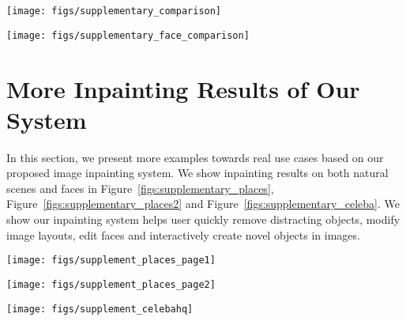 \documentclass[10pt,twocolumn,letterpaper]{article}
\begin{document}
\begin{figure*}[ht]
  \centering
  \vspace*{-9.5mm}
  \texttt{[image: figs/supplementary\_comparison]}
  \vspace*{-5mm}
  \caption{More comparison results on natural scenes. Best-viewed with zoom-in on PDF to see color shadows and artifacts.}
  \label{figs:supplementary_comparison}
\end{figure*}

\begin{figure*}[ht]
  \centering
  \texttt{[image: figs/supplementary\_face\_comparison]}
  \caption{More comparison results on faces. Best-viewed with zoom-in on PDF to see color shadows and artifacts.}
  \label{figs:supplementary_face_comparison}
\end{figure*}

\section{More Inpainting Results of Our System} \label{secs:more_results}
In this section, we present more examples towards real use cases based on our proposed image inpainting system. We show inpainting results on both natural scenes and faces in Figure~\ref{figs:supplementary_places}, Figure~\ref{figs:supplementary_places2} and Figure~\ref{figs:supplementary_celeba}. We show our inpainting system helps user quickly remove distracting objects, modify image layouts, edit faces and interactively create novel objects in images.

\begin{figure*}[t]
  \centering
  \texttt{[image: figs/supplement\_places\_page1]}
  \caption{More results from our free-form inpainting system on natural images (1).}
  \label{figs:supplementary_places}
\end{figure*}

\begin{figure*}[t]
  \centering
  \texttt{[image: figs/supplement\_places\_page2]}
  \caption{More results from our free-form inpainting system on natural images (2).}
  \label{figs:supplementary_places2}
\end{figure*}

\begin{figure*}[ht]
  \centering
  \texttt{[image: figs/supplement\_celebahq]}
  \caption{More results from our free-form inpainting system on faces.}
  \label{figs:supplementary_celeba}
\end{figure*}

 
\end{document}
